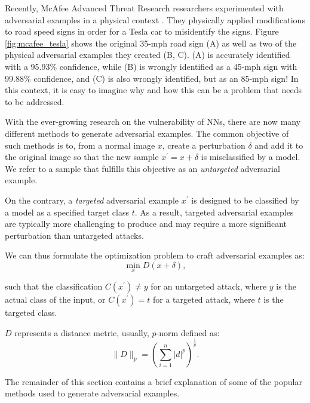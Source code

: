 Recently, McAfee Advanced Threat Research researchers experimented with
adversarial examples in a physical context \cite{noauthor_model_2020}. They
physically applied modifications to road speed signs in order for a Tesla car to
misidentify the signs. Figure \ref{fig:mcafee_tesla} shows the original 35-mph
road sign (A) as well as two of the physical adversarial examples they created
(B, C). (A) is accurately identified with a 95.93\% confidence, while (B) is
wrongly identified as a 45-mph sign with 99.88\% confidence, and (C) is also
wrongly identified, but as an 85-mph sign! In this context, it is easy to
imagine why and how this can be a problem that needs to be addressed.




With the ever-growing research on the vulnerability of NNs, there are now many
different methods to generate adversarial examples. The common objective of such
methods is to, from a normal image $x$, create a perturbation $\delta$ and add
it to the original image so that the new sample $x^{\prime}=x+\delta$ is
misclassified by a model. We refer to a sample that fulfills this objective as
an \textit{untargeted} adversarial example.

On the contrary, a \textit{targeted} adversarial example $x^{\prime}$ is
designed to be classified by a model as a specified target class $t$. As a
result, targeted adversarial examples are typically more challenging to produce
and may require a more significant perturbation than untargeted attacks.

We can thus formulate the optimization problem to craft adversarial examples as:
\begin{equation} \label{eq:adversarial_example_min}
    \min_{x}D(x+\delta),
\end{equation}


such that the classification $C(x^\prime)\neq{y}$ for an untargeted attack,
where $y$ is the actual class of the input, or $C(x^\prime)={t}$ for a targeted
attack, where $t$ is the targeted class.

$D$ represents a distance metric, usually, $p$-norm defined as:
\begin{equation} \label{eq:p-norm}
    \lVert D
    \lVert_{p}=\left(\sum_{i=1}^{n}|d|^{p}\right)^{\frac{1}{p}}.
\end{equation}

The remainder of this section contains a brief explanation of some of the
popular methods used to generate adversarial examples.

